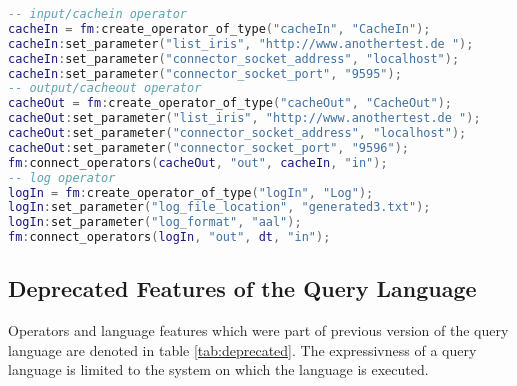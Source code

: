 \begin{lstlisting}[language=Lua, caption={\emph{Examples of System Operators in LUA}},label={lst:exanlua}]
-- input/cachein operator
cacheIn = fm:create_operator_of_type("cacheIn", "CacheIn");
cacheIn:set_parameter("list_iris", "http://www.anothertest.de ");
cacheIn:set_parameter("connector_socket_address", "localhost");
cacheIn:set_parameter("connector_socket_port", "9595");
-- output/cacheout operator
cacheOut = fm:create_operator_of_type("cacheOut", "CacheOut");
cacheOut:set_parameter("list_iris", "http://www.anothertest.de ");
cacheOut:set_parameter("connector_socket_address", "localhost");
cacheOut:set_parameter("connector_socket_port", "9596");
fm:connect_operators(cacheOut, "out", cacheIn, "in");
-- log operator
logIn = fm:create_operator_of_type("logIn", "Log");
logIn:set_parameter("log_file_location", "generated3.txt");
logIn:set_parameter("log_format", "aal");
fm:connect_operators(logIn, "out", dt, "in");
\end{lstlisting}

\subsection{Deprecated Features of the Query Language}
Operators and language features which were part of previous version of the query
language are denoted in table \ref{tab:deprecated}. The expressivness of a query
language is limited to the system on which the language is executed.

